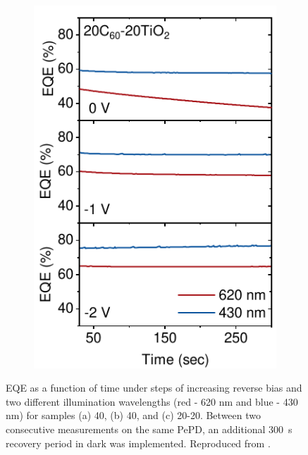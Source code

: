 \begin{figure}[htbp]
\begin{subfigure}{0.32\textwidth}
        \includegraphics[width=\textwidth]{chapters/transport_layers/images/StaticEQE_20_20.pdf}
        \caption{}
        \label{}
    \end{subfigure}
    
    \caption[EQE as a function of time under steps of increasing reverse bias and two different illumination wavelengths (red - 620 nm and blue - 430 nm) for samples 40, 40, or 20-20 as the ETL.]{EQE as a function of time under steps of increasing reverse bias and two different illumination wavelengths (red - 620 nm and blue - 430 nm) for samples (a) 40, (b) 40, and (c) 20-20. Between two consecutive measurements on the same PePD, an additional 300~s recovery period in dark was implemented. Reproduced from \cite{Papadopoulou2025ElectronSpeed}.}
    \label{fig:etl_opt:static_eqe}
\end{figure}



